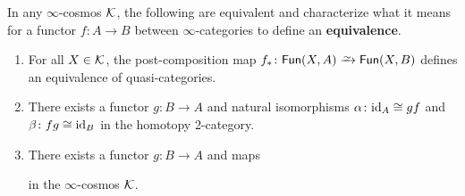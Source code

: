   \begin{theorem}\label{thm:equiv-are-equiv}
     In any $\infty$-cosmos ${\mathord{\mathcal{K}}}$, the following are equivalent and characterize what it means for a functor $f \colon A \to B$ between $\infty$-categories to define an \textbf{equivalence}.
  \begin{enumerate}
  \item\label{itm:rep-equiv} For all $X \in {\mathord{\mathcal{K}}}$, the post-composition map $f_* \colon \Fun(X,A) \we \Fun(X,B)$ defines an equivalence of quasi-categories.
  \item\label{itm:2cat-equiv} There exists a functor $g \colon B \to A$ and natural isomorphisms $\alpha \colon \textup{id}_A \cong gf$ and $\beta \colon fg \cong \textup{id}_B$ in the homotopy 2-category.
  \item\label{itm:htpy-equiv} There exists a functor $g \colon B \to A$ and maps
  \begin{center}
  \end{center} in the $\infty$-cosmos ${\mathord{\mathcal{K}}}$.
  \end{enumerate}
  \end{theorem}

